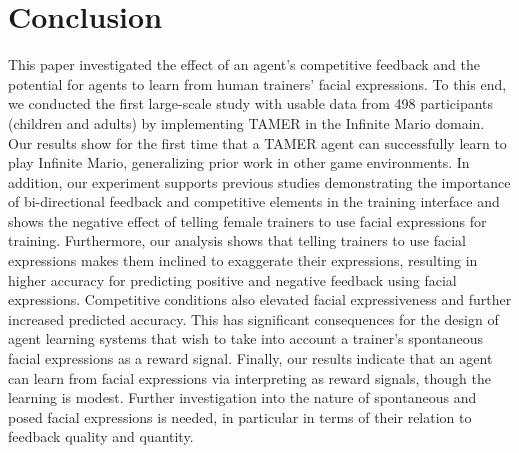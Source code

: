 \documentclass[10pt,journal,compsoc]{IEEEtran}
\begin{document}
\vspace{2mm}

\section{Conclusion}%
\label{sec:con}
This paper investigated the effect of an agent's competitive feedback and the potential for agents to learn from human trainers' facial expressions.
To this end, we conducted the first large-scale study with usable data from 498 participants (children and adults) by implementing TAMER in the Infinite Mario domain.  Our results show for the first time that a TAMER agent can successfully learn to play Infinite Mario, generalizing prior work in other game environments.  In addition, our experiment supports previous studies demonstrating the importance of bi-directional feedback and competitive elements in the training interface and shows the negative effect of telling female trainers to use facial expressions for training. %
Furthermore, %
our analysis shows that telling trainers to use facial expressions makes them inclined to exaggerate their expressions, resulting in higher accuracy for predicting positive and negative feedback using facial expressions. Competitive conditions also elevated facial expressiveness and further increased predicted accuracy. This has significant consequences for the design of agent learning systems that wish to take into account a trainer's spontaneous facial expressions as a reward signal. Finally, our results indicate that an agent can learn from facial expressions via interpreting as reward signals, though the learning is modest. Further investigation into the nature of spontaneous and posed facial expressions is needed, in particular in terms of their relation to feedback quality and quantity.
\end{document}
